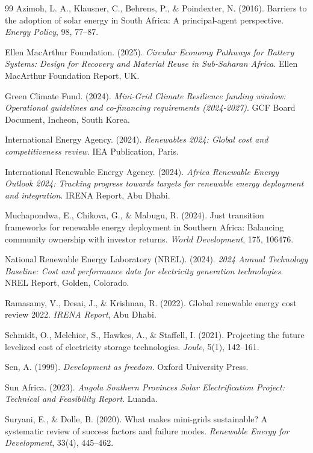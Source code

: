\documentclass[12pt, a4paper]{article}
\begin{document}
\begin{thebibliography}{99}
 Azimoh, L. A., Klausner, C., Behrens, P., \& Poindexter, N. (2016). Barriers to the adoption of solar energy in South Africa: A principal-agent perspective. \textit{Energy Policy}, 98, 77--87.

 Ellen MacArthur Foundation. (2025). \textit{Circular Economy Pathways for Battery Systems: Design for Recovery and Material Reuse in Sub-Saharan Africa}. Ellen MacArthur Foundation Report, UK.

 Green Climate Fund. (2024). \textit{Mini-Grid Climate Resilience funding window: Operational guidelines and co-financing requirements (2024-2027)}. GCF Board Document, Incheon, South Korea.

 International Energy Agency. (2024). \textit{Renewables 2024: Global cost and competitiveness review}. IEA Publication, Paris.

 International Renewable Energy Agency. (2024). \textit{Africa Renewable Energy Outlook 2024: Tracking progress towards targets for renewable energy deployment and integration}. IRENA Report, Abu Dhabi.

 Muchapondwa, E., Chikova, G., \& Mabugu, R. (2024). Just transition frameworks for renewable energy deployment in Southern Africa: Balancing community ownership with investor returns. \textit{World Development}, 175, 106476.

 National Renewable Energy Laboratory (NREL). (2024). \textit{2024 Annual Technology Baseline: Cost and performance data for electricity generation technologies}. NREL Report, Golden, Colorado.

 Ramasamy, V., Desai, J., \& Krishnan, R. (2022). Global renewable energy cost review 2022. \textit{IRENA Report}, Abu Dhabi.

 Schmidt, O., Melchior, S., Hawkes, A., \& Staffell, I. (2021). Projecting the future levelized cost of electricity storage technologies. \textit{Joule}, 5(1), 142--161.

 Sen, A. (1999). \textit{Development as freedom}. Oxford University Press.

 Sun Africa. (2023). \textit{Angola Southern Provinces Solar Electrification Project: Technical and Feasibility Report}. Luanda.

 Suryani, E., \& Dolle, B. (2020). What makes mini-grids sustainable? A systematic review of success factors and failure modes. \textit{Renewable Energy for Development}, 33(4), 445--462.


\end{thebibliography}
\end{document}
